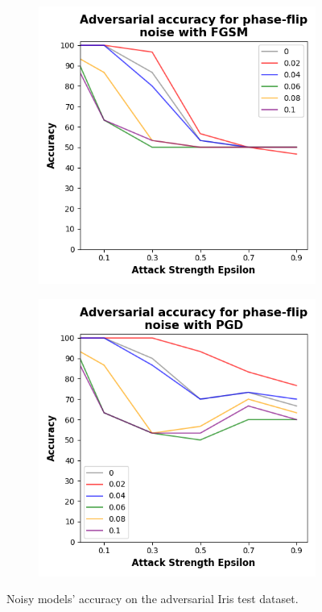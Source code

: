 \begin{figure}[!h]
  \begin{subfigure}{0.45\textwidth}
      \includegraphics[width=\linewidth]{figures/evaluation_results/iris/pqc/figures/phase-flip-fgsm.png}
      \label{fig:iris15}
  \end{subfigure} \qquad
  \begin{subfigure}{0.45\textwidth}
      \includegraphics[width=\linewidth]{figures/evaluation_results/iris/pqc/figures/phase-flip-pgd.png}
      \label{fig:iris16}
  \end{subfigure}

  \caption{Noisy models' accuracy on the adversarial Iris test dataset.}
\end{figure} \

